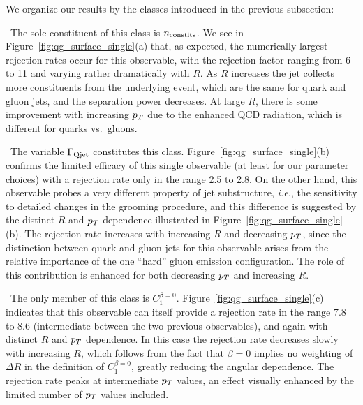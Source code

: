  We organize our results by the classes introduced in the previous subsection:

~The sole constituent of this class is $n_{\rm constits}$. We see in  Figure~\ref{fig:qg_surface_single}(a) that, as expected,  the numerically largest rejection rates occur
for this observable, with the rejection factor ranging from 6 to 11 and 
varying rather dramatically with $R$.  As $R$ increases the jet collects more constituents from the underlying event, which are the same
for quark and gluon jets, and the separation power decreases.  At large $R$, there is some improvement with increasing $p_T$ due to the 
enhanced QCD radiation, which is different for quarks vs.~gluons.  

~The variable $\Gamma_{\rm Qjet}$ constitutes this class. Figure~\ref{fig:qg_surface_single}(b) confirms the limited efficacy of this single
observable (at least for our parameter choices) with a rejection rate only in the range 2.5 to 2.8.  On the other hand, this 
observable probes a very different
property of jet substructure, \textit{i.e.}, the sensitivity to detailed changes in the grooming procedure, and this difference is suggested
by the distinct $R$ and $p_T$ dependence illustrated in  Figure~\ref{fig:qg_surface_single}(b).  The rejection rate increases with increasing $R$
and decreasing $p_T$, since the distinction between quark and gluon jets for this observable arises from the relative importance of the one
``hard'' gluon emission configuration.  The role of this contribution is enhanced for both decreasing $p_T$ and increasing $R$. 


~The only member of this class is $C_1^{\beta=0}$. Figure~\ref{fig:qg_surface_single}(c) indicates that this observable  can itself provide a rejection rate in the range
7.8 to 8.6 (intermediate between the two previous observables), and again with distinct $R$ and $p_T$ dependence.  In this case the rejection
rate decreases slowly with increasing $R$, which follows from the fact that $\beta = 0$ implies no weighting of $\Delta R$ in the definition of $C_1^{\beta=0}$, greatly reducing 
the angular dependence.
The rejection rate peaks at intermediate $p_T$ values, an effect visually enhanced by the limited number of 
$p_T$ values included.  


